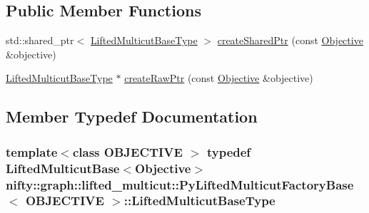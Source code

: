 \subsection*{Public Member Functions}
\begin{DoxyCompactItemize}
\item 
std\+::shared\+\_\+ptr$<$ \hyperlink{classnifty_1_1graph_1_1lifted__multicut_1_1LiftedMulticutFactoryBase_a7b9c862fe5eba2ec7438ca48bb398e1c}{Lifted\+Multicut\+Base\+Type} $>$ \hyperlink{classnifty_1_1graph_1_1lifted__multicut_1_1PyLiftedMulticutFactoryBase_a66484b03b93a7007d29f0367153a61b2}{create\+Shared\+Ptr} (const \hyperlink{classnifty_1_1graph_1_1lifted__multicut_1_1PyLiftedMulticutFactoryBase_a00bf8d423b596b2842021a7828ed1e33}{Objective} \&objective)
\item 
\hyperlink{classnifty_1_1graph_1_1lifted__multicut_1_1LiftedMulticutFactoryBase_a7b9c862fe5eba2ec7438ca48bb398e1c}{Lifted\+Multicut\+Base\+Type} $\ast$ \hyperlink{classnifty_1_1graph_1_1lifted__multicut_1_1PyLiftedMulticutFactoryBase_a30a790585dadce7cb61ec0bb5140d2a6}{create\+Raw\+Ptr} (const \hyperlink{classnifty_1_1graph_1_1lifted__multicut_1_1PyLiftedMulticutFactoryBase_a00bf8d423b596b2842021a7828ed1e33}{Objective} \&objective)
\end{DoxyCompactItemize}


\subsection{Member Typedef Documentation}
\hypertarget{classnifty_1_1graph_1_1lifted__multicut_1_1PyLiftedMulticutFactoryBase_a741c8fdfdc6b6ff7d007a27b56dfb300}{}
\subsubsection[{Lifted\+Multicut\+Base\+Type}]{\setlength{\rightskip}{0pt plus 5cm}template$<$class O\+B\+J\+E\+C\+T\+I\+V\+E $>$ typedef {\bf Lifted\+Multicut\+Base}$<${\bf Objective}$>$ {\bf nifty\+::graph\+::lifted\+\_\+multicut\+::\+Py\+Lifted\+Multicut\+Factory\+Base}$<$ O\+B\+J\+E\+C\+T\+I\+V\+E $>$\+::{\bf Lifted\+Multicut\+Base\+Type}}\label{classnifty_1_1graph_1_1lifted__multicut_1_1PyLiftedMulticutFactoryBase_a741c8fdfdc6b6ff7d007a27b56dfb300}
\hypertarget{classnifty_1_1graph_1_1lifted__multicut_1_1PyLiftedMulticutFactoryBase_a00bf8d423b596b2842021a7828ed1e33}{}
